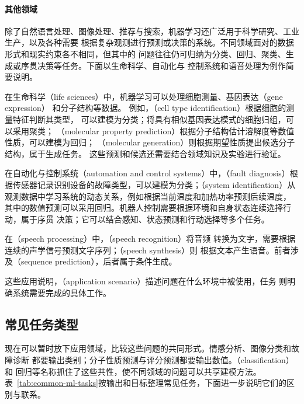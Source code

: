 \paragraph{其他领域}
除了自然语言处理、图像处理、推荐与搜索，机器学习还广泛用于科学研究、工业生产，以及各种需要
根据复杂观测进行预测或决策的系统。不同领域面对的数据形式和现实约束各不相同，但其中的
问题往往仍可归纳为分类、回归、聚类、生成或序贯决策等任务。下面以生命科学、自动化与
控制系统和语音处理为例作简要说明。

在生命科学（life sciences）中，机器学习可以处理细胞测量、基因表达（gene expression）
和分子结构等数据。
例如，（cell type identification）根据细胞的测量特征判断其类型，
可以建模为分类；将具有相似基因表达模式的细胞归组，可以采用聚类；
（molecular property prediction）根据分子结构估计溶解度等数值性质，可以建模为回归；
（molecular generation）则根据期望性质提出候选分子结构，属于生成任务。
这些预测和候选还需要结合领域知识及实验进行验证。

在自动化与控制系统（automation and control systems）中，（fault
diagnosis）根据传感器记录识别设备的故障类型，可以建模为分类；（system
identification）从观测数据中学习系统的动态关系，例如根据当前温度和加热功率预测后续温度，
其中的数值预测可以采用回归。机器人控制需要根据环境和自身状态连续选择行动，属于序贯
决策；它可以结合感知、状态预测和行动选择等多个任务。

在（speech processing）中，（speech recognition）将音频
转换为文字，需要根据连续的声学信号预测文字序列；（speech synthesis）则
根据文本产生语音。前者涉及（sequence prediction），后者属于条件生成。

这些应用说明，（application scenario）描述问题在什么环境中被使用，任务
则明确系统需要完成的具体工作。

\subsection{常见任务类型}

现在可以暂时放下应用领域，比较这些问题的共同形式。情感分析、图像分类和故障诊断
都要输出类别；分子性质预测与评分预测都要输出数值。（classification）和
回归等名称抓住了这些共性，使不同领域的问题可以共享建模方法。
表~\ref{tab:common-ml-tasks}按输出和目标整理常见任务，下面进一步说明它们的区别与联系。

